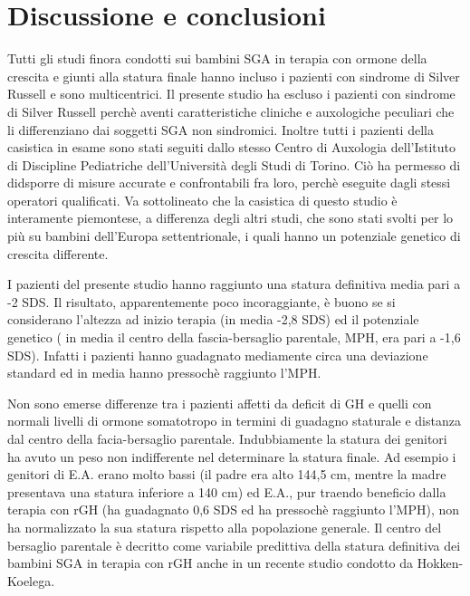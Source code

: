 \chapter{Discussione e conclusioni}


Tutti gli studi finora condotti sui bambini SGA in terapia con ormone della crescita e giunti alla statura finale hanno incluso i pazienti con sindrome di Silver Russell e sono multicentrici. Il presente studio ha escluso i pazienti con sindrome di Silver Russell perchè aventi caratteristiche cliniche e auxologiche peculiari che li differenziano dai soggetti SGA non sindromici. Inoltre tutti i pazienti della casistica in esame sono stati seguiti dallo stesso Centro di Auxologia dell'Istituto di Discipline Pediatriche dell'Università degli Studi di Torino. Ciò ha permesso di didsporre di misure accurate e confrontabili fra loro, perchè eseguite dagli stessi operatori qualificati. Va sottolineato che la casistica di questo studio è interamente piemontese, a differenza degli altri studi, che sono stati svolti per lo più su bambini dell'Europa settentrionale, i quali hanno un potenziale genetico di crescita differente.

I pazienti del presente studio hanno raggiunto una statura definitiva media pari a -2 SDS. Il risultato, apparentemente poco incoraggiante, è buono se si considerano l'altezza ad inizio terapia (in media -2,8 SDS) ed il potenziale genetico ( in media il centro della fascia-bersaglio parentale, MPH, era pari a -1,6 SDS). Infatti i pazienti hanno guadagnato mediamente circa una deviazione standard ed in media hanno pressochè raggiunto l'MPH. 

Non sono emerse differenze tra i pazienti affetti da deficit di GH e quelli con normali livelli di ormone somatotropo in termini di guadagno staturale e distanza dal centro della facia-bersaglio parentale. Indubbiamente la statura dei genitori ha avuto un peso non indifferente nel determinare la statura finale. Ad esempio i genitori di E.A. erano molto bassi (il padre era alto 144,5 cm, mentre la madre presentava una statura inferiore a 140 cm) ed E.A., pur traendo beneficio dalla terapia con rGH (ha guadagnato 0,6 SDS ed ha pressochè raggiunto l'MPH), non ha normalizzato la sua statura rispetto alla popolazione generale.
Il centro del bersaglio parentale è decritto come variabile predittiva della statura definitiva dei bambini SGA in terapia con rGH anche in un recente studio condotto da Hokken-Koelega\cite{de2008prediction}.

